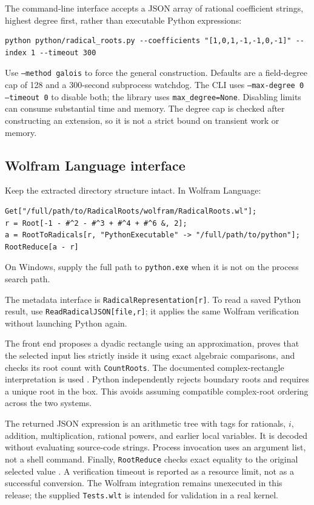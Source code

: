 \documentclass[11pt,a4paper]{article}
\theoremstyle{definition}\newtheorem{definition}[theorem]{Definition}
\theoremstyle{remark}\newtheorem{remark}[theorem]{Remark}
\newcommand{\code}[1]{\texttt{#1}}
\begin{document}
The command-line interface accepts a JSON array of rational coefficient
strings, highest degree first, rather than executable Python expressions:
\begin{lstlisting}
python python/radical_roots.py --coefficients "[1,0,1,-1,-1,0,-1]" --index 1 --timeout 300
\end{lstlisting}
Use \code{--method galois} to force the general construction. Defaults are
a field-degree cap of 128 and a 300-second subprocess watchdog. The CLI
uses \code{--max-degree 0 --timeout 0} to disable both; the library uses
\code{max\_degree=None}. Disabling limits can consume substantial time and
memory. The degree cap is checked after constructing an extension, so it is
not a strict bound on transient work or memory.

\subsection{Wolfram Language interface}
Keep the extracted directory structure intact. In Wolfram Language:
\begin{lstlisting}
Get["/full/path/to/RadicalRoots/wolfram/RadicalRoots.wl"];
r = Root[-1 - #^2 - #^3 + #^4 + #^6 &, 2];
a = RootToRadicals[r, "PythonExecutable" -> "/full/path/to/python"];
RootReduce[a - r]
\end{lstlisting}
On Windows, supply the full path to \code{python.exe} when it is not on the
process search path.

The metadata interface is \code{RadicalRepresentation[r]}. To read a saved
Python result, use \code{ReadRadicalJSON[file,r]}; it applies the same Wolfram
verification without launching Python again.

The front end proposes a dyadic rectangle using an approximation, proves
that the selected input lies strictly inside it using exact algebraic
comparisons, and checks its root count with \code{CountRoots}. The documented
complex-rectangle interpretation is used \cite{countroots}. Python independently
rejects boundary roots and requires a unique root in the box. This avoids
assuming compatible complex-root ordering across the two systems.

The returned JSON expression is an arithmetic tree with tags for rationals,
$i$, addition, multiplication, rational powers, and earlier local variables.
It is decoded without evaluating source-code strings. Process invocation
uses an argument list, not a shell command. Finally, \code{RootReduce}
checks exact equality to the original selected value \cite{rootreduce}.
A verification timeout is reported as a resource limit, not as a successful
conversion. The Wolfram integration remains unexecuted in this release;
the supplied \code{Tests.wlt} is intended for validation in a real kernel.
\end{document}
